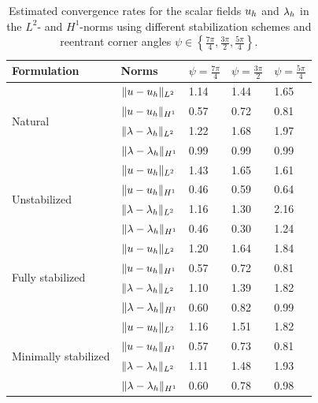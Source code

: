 \begin{table}[h!]
	\centering
	\caption{Estimated convergence rates for the scalar fields $ u_h $ and $ \lambda_h $ in the $ L^2 $- and $ H^1 $-norms using different stabilization schemes and reentrant corner angles $ \psi \in \left\{ \frac{7\pi}{4}, \frac{3\pi}{2}, \frac{5\pi}{4} \right\} $.}
	\begin{tabular}{l l l l l}
		\toprule
		Formulation & Norms & $\psi = \frac{7\pi}{4}$ & $\psi = \frac{3\pi}{2}$ & $\psi = \frac{5\pi}{4}$ \\ [2pt]
		\hline
		\multirow{4}{*}{Natural}				 & $\|u-u_{h}\|_{L^{2}}$ & 1.14  & 1.44  & 1.65  \\
		                                 & $\|u-u_{h}\|_{H^{1}}$ & 0.57 & 0.72  & 0.81 \\
		                                 & $\|\lambda-\lambda_{h}\|_{L^{2}}$ & 1.22  & 1.68 & 1.97  \\
		                                 & $\|\lambda-\lambda_{h}\|_{H^{1}}$ & 0.99  & 0.99 & 0.99  \\
		\hline
		\multirow{4}{*}{Unstabilized}    & $\|u-u_{h}\|_{L^{2}}$ & 1.43 & 1.65 & 1.61 \\
		                                 & $\|u-u_{h}\|_{H^{1}}$ & 0.46 & 0.59 & 0.64 \\
		                                 & $\|\lambda-\lambda_{h}\|_{L^{2}}$ & 1.16 & 1.30 & 2.16 \\
		                                 & $\|\lambda-\lambda_{h}\|_{H^{1}}$ & 0.46 & 0.30 & 1.24 \\
		\hline
		\multirow{4}{*}{Fully stabilized} & $\|u-u_{h}\|_{L^{2}}$ & 1.20 & 1.64 & 1.84 \\
		                                 & $\|u-u_{h}\|_{H^{1}}$ & 0.57 & 0.72 & 0.81 \\
		                                 & $\|\lambda-\lambda_{h}\|_{L^{2}}$ & 1.10 & 1.39 & 1.82 \\
		                                 & $\|\lambda-\lambda_{h}\|_{H^{1}}$ & 0.60 & 0.82 & 0.99 \\
		\hline
		\multirow{4}{*}{Minimally stabilized} & $\|u-u_{h}\|_{L^{2}}$ & 1.16 & 1.51 & 1.82 \\
		                                     & $\|u-u_{h}\|_{H^{1}}$ & 0.57 & 0.73 & 0.81 \\
		                                     & $\|\lambda-\lambda_{h}\|_{L^{2}}$ & 1.11 & 1.48 & 1.93 \\
		                                     & $\|\lambda-\lambda_{h}\|_{H^{1}}$ & 0.60 & 0.78 & 0.98 \\
		\bottomrule
	\end{tabular}
	\label{tab:scalar_errors}
\end{table}
